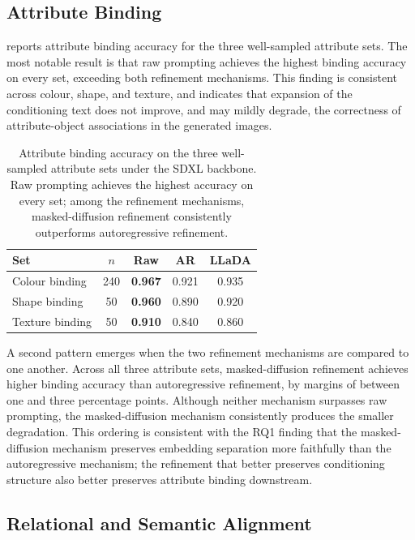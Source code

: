 \documentclass[a4paper,twoside,12pt]{report}
\begin{document}
\subsection{Attribute Binding}

 reports attribute binding accuracy for the three
well-sampled attribute sets. The most notable result is that raw prompting
achieves the highest binding accuracy on every set, exceeding both refinement
mechanisms. This finding is consistent across colour, shape, and texture, and
indicates that expansion of the conditioning text does not improve, and may
mildly degrade, the correctness of attribute-object associations in the
generated images.

\begin{table}[H]
\centering
\begin{tabular}{lcccc}
\toprule
\textbf{Set} & \textbf{\(n\)} & \textbf{Raw} & \textbf{AR} & \textbf{LLaDA} \\
\midrule
Colour binding  & 240 & \textbf{0.967} & 0.921 & 0.935 \\
Shape binding   & 50  & \textbf{0.960} & 0.890 & 0.920 \\
Texture binding & 50  & \textbf{0.910} & 0.840 & 0.860 \\
\bottomrule
\end{tabular}
\caption[Attribute binding accuracy under SDXL]{Attribute binding accuracy on
the three well-sampled attribute sets under the SDXL backbone. Raw prompting
achieves the highest accuracy on every set; among the refinement mechanisms,
masked-diffusion refinement consistently outperforms autoregressive refinement.}
\label{tab:rq2_binding}
\end{table}

A second pattern emerges when the two refinement mechanisms are compared to one
another. Across all three attribute sets, masked-diffusion refinement achieves
higher binding accuracy than autoregressive refinement, by margins of between
one and three percentage points. Although neither mechanism surpasses raw
prompting, the masked-diffusion mechanism consistently produces the smaller
degradation. This ordering is consistent with the RQ1 finding that the
masked-diffusion mechanism preserves embedding separation more faithfully than
the autoregressive mechanism; the refinement that better preserves conditioning
structure also better preserves attribute binding downstream.

\subsection{Relational and Semantic Alignment}
\end{document}
